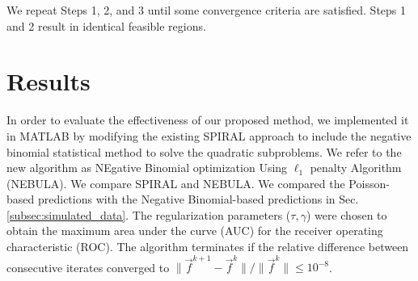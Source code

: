 \documentclass{article}
\begin{document}
We repeat Steps 1, 2, and 3 until some convergence criteria are satisfied. Steps 1 and 2  result in identical feasible regions. 

\section{Results}
In order to evaluate the effectiveness of our proposed method, we implemented it in MATLAB by modifying the existing SPIRAL approach \cite{Marcia_SPIRALTAP} to include the negative binomial statistical method \cite{Marcia_SPIRALTAP} to solve the quadratic subproblems. We refer to the new algorithm as NEgative Binomial optimization Using $\ell_1$ penalty Algorithm (NEBULA). We compare SPIRAL and NEBULA. We compared the Poisson-based predictions with the Negative Binomial-based predictions in Sec.\ref{subsec:simulated_data}. The regularization parameters ($\tau, \gamma$) were chosen to obtain the maximum area under the curve (AUC) for the receiver operating characteristic (ROC). The algorithm terminates if the relative difference between consecutive iterates converged to $\|\vec{f}^{k+1} - \vec{f}^{k}\|/\|\vec{f}^{k}\| \leq 10^{-8}$.
\end{document}
